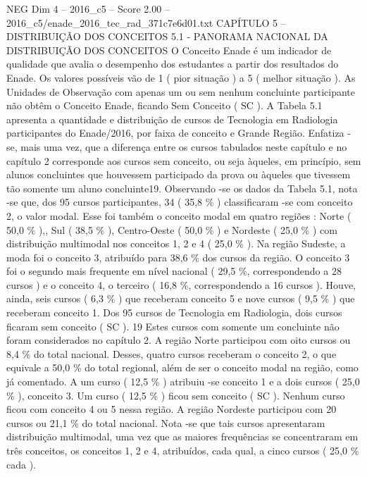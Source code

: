 \begin{textsample}{NEG Dim 4 – 2016\_c5 – Score 2.00 – 2016\_c5/enade\_2016\_tec\_rad\_371c7e6d01.txt}  \label{ex:f4_neg_256}
CAPÍTULO 5 – DISTRIBUIÇÃO DOS CONCEITOS 5.1 - PANORAMA NACIONAL DA DISTRIBUIÇÃO DOS CONCEITOS O Conceito Enade é um indicador de qualidade que avalia o desempenho dos estudantes a partir dos resultados do Enade.
Os valores possíveis vão de 1 ( pior situação ) a 5 ( melhor situação ).
As Unidades de Observação com apenas um ou sem nenhum concluinte participante não obtêm o Conceito Enade, ficando Sem Conceito ( SC ).
A Tabela 5.1 apresenta a quantidade e distribuição de cursos de Tecnologia em Radiologia participantes do Enade/2016, por faixa de conceito e Grande Região.
Enfatiza -se, mais uma vez, que a diferença entre os cursos tabulados neste capítulo e no capítulo 2 corresponde aos cursos sem conceito, ou seja àqueles, em princípio, sem alunos concluintes que houvessem participado da prova ou àqueles que tivessem tão somente um aluno concluinte19.
Observando -se os dados da Tabela 5.1, nota -se que, dos 95 cursos participantes, 34 ( 35,8 \% ) classificaram -se com conceito 2, o valor modal.
Esse foi também o conceito modal em quatro regiões : Norte ( 50,0 \% ),, Sul ( 38,5 \% ), Centro-Oeste ( 50,0 \% ) e Nordeste ( 25,0 \% ) com distribuição multimodal nos conceitos 1, 2 e 4 ( 25,0 \% ).
Na região Sudeste, a moda foi o conceito 3, atribuído para 38,6 \% dos cursos da região.
O conceito 3 foi o segundo mais frequente em nível nacional ( 29,5 \%, correspondendo a 28 cursos ) e o conceito 4, o terceiro ( 16,8 \%, correspondendo a 16 cursos ).
Houve, ainda, seis cursos ( 6,3 \% ) que receberam conceito 5 e nove cursos ( 9,5 \% ) que receberam conceito 1.
Dos 95 cursos de Tecnologia em Radiologia, dois cursos ficaram sem conceito ( SC ). 19 Estes cursos com somente um concluinte não foram considerados no capítulo 2.
A região Norte participou com oito cursos ou 8,4 \% do total nacional.
Desses, quatro cursos receberam o conceito 2, o que equivale a 50,0 \% do total regional, além de ser o conceito modal na região, como já comentado.
A um curso ( 12,5 \% ) atribuiu -se conceito 1 e a dois cursos ( 25,0 \% ), conceito 3.
Um curso ( 12,5 \% ) ficou sem conceito ( SC ).
Nenhum curso ficou com conceito 4 ou 5 nessa região.
A região Nordeste participou com 20 cursos ou 21,1 \% do total nacional.
Nota -se que tais cursos apresentaram distribuição multimodal, uma vez que as maiores frequências se concentraram em três conceitos, os conceitos 1, 2 e 4, atribuídos, cada qual, a cinco cursos ( 25,0 \% cada ).

\end{textsample}
